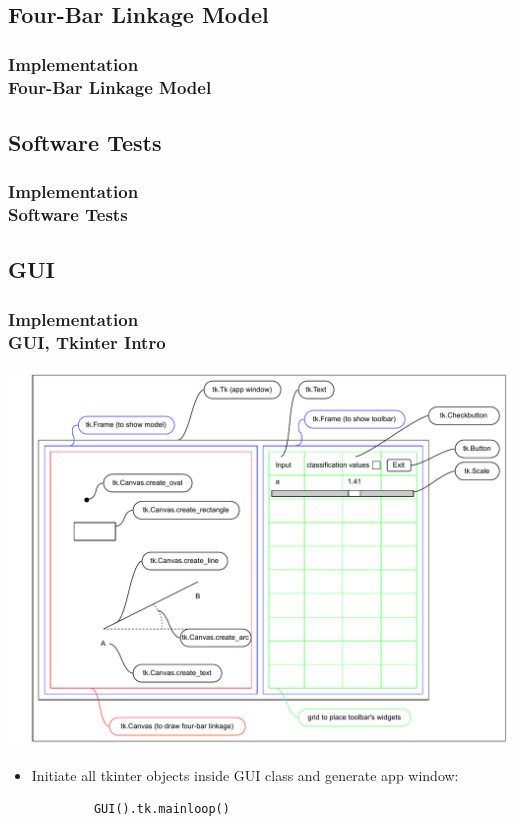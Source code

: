 \documentclass[ucs,10pt]{beamer}
\begin{document}
\subsection{Four-Bar Linkage Model}

\begin{frame}
\frametitle{Implementation \\
	\small \color{rwth-blue} Four-Bar Linkage Model}
\end{frame}

\subsection{Software Tests}

\begin{frame}
	\frametitle{Implementation \\
		\small \color{rwth-blue} Software Tests}
\end{frame}

\subsection{GUI}

\begin{frame}[fragile]
\frametitle{Implementation \\
	\small \color{rwth-blue} GUI, Tkinter Intro}
	\begin{center}
		\vspace*{-1mm}
		\includegraphics[width=0.78\linewidth]{./Figures/Implementation/GUI/tkinter_grid.pdf}
		\begin{itemize}
			\item Initiate all tkinter objects inside GUI class and generate app window:
		\end{itemize}
		\begin{lstlisting}
			GUI().tk.mainloop()
		\end{lstlisting}
	\end{center}
\end{frame}
\end{document}
